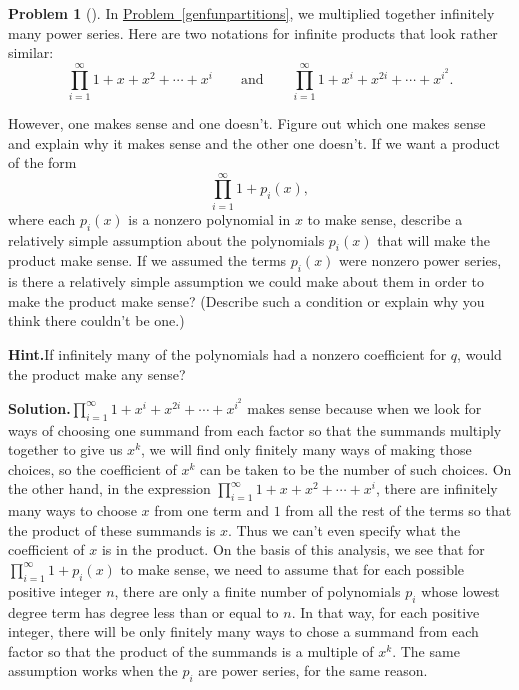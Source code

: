 \documentclass[10pt,]{book}
\theoremstyle{plain}
\theoremstyle{definition}
\newtheorem{activity}[project]{Problem}
\theoremstyle{definition}
\numberwithin{equation}{chapter}
\begin{document}
\begin{activity}[]\label{activity-204}
In \hyperref[genfunpartitions]{Problem~\ref{genfunpartitions}}, we multiplied together infinitely many power series. Here are two notations for infinite products that look rather similar:%
\begin{equation*}
\prod_{i=1}^\infty 1 + x + x^2 +\cdots+ x^i\qquad\mbox{and}\qquad
\prod_{i=1}^\infty 1 +x^i +x^{2i} +\cdots + x^{i^2}.
\end{equation*}
%
\par
However, one makes sense and one doesn't. Figure out which one makes sense and explain why it makes sense and the other one doesn't. If we want a product of the form%
\begin{equation*}
\prod_{i=1}^\infty 1 +p_i(x),
\end{equation*}
where each \(p_i(x)\) is a nonzero polynomial in \(x\) to make sense, describe a relatively simple assumption about the polynomials \(p_i(x)\) that will make the product make sense. If we assumed the terms \(p_i(x)\) were nonzero power series, is there a relatively simple assumption we could make about them in order to make the product make sense? (Describe such a condition or explain why you think there couldn't be one.)%
\par\medskip\noindent%
\textbf{Hint.}\quad If infinitely many of the polynomials had a nonzero coefficient for \(q\), would the product make any sense?%
\par\medskip\noindent%
\textbf{Solution.}\quad \(\prod_{i=1}^\infty 1 +x^i +x^{2i} +\cdots + x^{i^2}\) makes sense because when we look for ways of choosing one summand from each factor so that the summands multiply together to give us \(x^k\), we will find only finitely many ways of making those choices, so the coefficient of \(x^k\) can be taken to be the number of such choices. On the other hand, in the expression \(\prod_{i=1}^\infty 1 + x + x^2 +\cdots+ x^i\), there are infinitely many ways to choose \(x\) from one term and \(1\) from all the rest of the terms so that the product of these summands is \(x\). Thus we can't even specify what the coefficient of \(x\) is in the product. On the basis of this analysis, we see that for \(\prod_{i=1}^\infty 1 +p_i(x)\) to make sense, we need to assume that for each possible positive integer \(n\), there are only a finite number of polynomials \(p_i\) whose lowest degree term has degree less than or equal to \(n\). In that way, for each positive integer, there will be only finitely many ways to chose a summand from each factor so that the product of the summands is a multiple of \(x^k\). The same assumption works when the \(p_i\) are power series, for the same reason.%
\end{activity}
\end{document}
